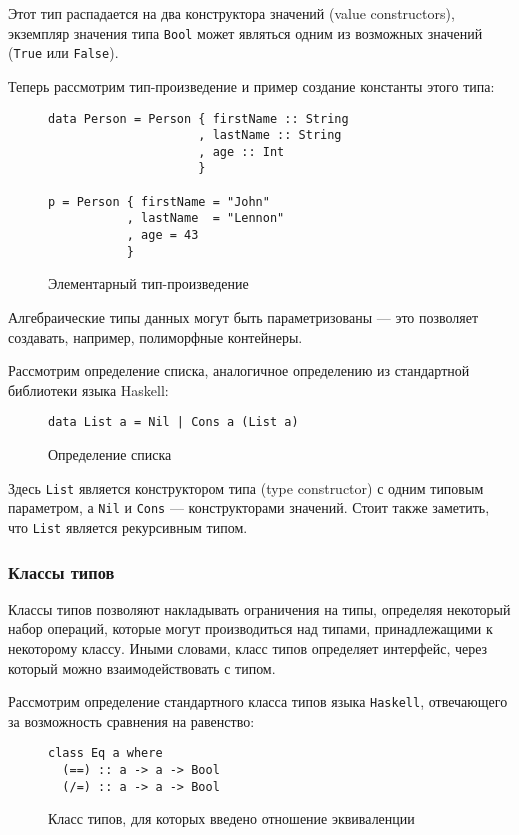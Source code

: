Этот тип распадается на два конструктора значений (value constructors), экземпляр значения типа \lstinline{Bool} может являться одним из возможных значений (\lstinline{True} или \lstinline{False}).

Теперь рассмотрим тип-произведение и пример создание константы этого типа: 

\begin{figure}[h]
\begin{lstlisting}
data Person = Person { firstName :: String
                     , lastName :: String
                     , age :: Int
                     }

p = Person { firstName = "John"
           , lastName  = "Lennon"
           , age = 43
           }
\end{lstlisting}
\caption{Элементарный тип-произведение}
\label{listing:Bool}
\end{figure}

Алгебраические типы данных могут быть параметризованы --- это позволяет создавать, например, полиморфные контейнеры.

Рассмотрим определение списка, аналогичное определению из стандартной библиотеки языка Haskell:

\begin{figure}[h]
\begin{lstlisting}
data List a = Nil | Cons a (List a)
\end{lstlisting}
\caption{Определение списка}
\label{listing:List}
\end{figure}

Здесь \lstinline{List} является конструктором типа (type constructor) с одним типовым параметром, а \lstinline{Nil} и \lstinline{Cons} --- конструкторами значений. Стоит также заметить, что \lstinline{List} является рекурсивным типом.

\subsubsection{Классы типов}

Классы типов позволяют накладывать ограничения на типы, определяя некоторый набор операций, которые могут производиться над типами, принадлежащими к некоторому классу. Иными словами, класс типов определяет интерфейс, через который можно взаимодействовать с типом.

Рассмотрим определение стандартного класса типов языка \lstinline{Haskell}, отвечающего за возможность сравнения на равенство:

\begin{figure}[h]
\begin{lstlisting}
class Eq a where
  (==) :: a -> a -> Bool
  (/=) :: a -> a -> Bool
\end{lstlisting}
\caption{Класс типов, для которых введено отношение эквиваленции}
\label{listing:Eq}
\end{figure}

